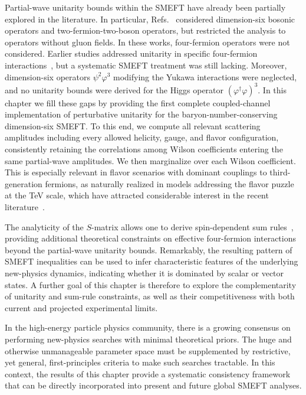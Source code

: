 Partial-wave unitarity bounds within the SMEFT have already been partially explored in the
literature. In particular, Refs.~\cite{Corbett:2014ora,Corbett:2017qgl,Cao:2023qks} considered
dimension-six bosonic operators and two-fermion-two-boson operators, but restricted the analysis to
operators without gluon fields. In these works, four-fermion operators were not considered. Earlier
studies addressed unitarity in specific four-fermion interactions~\cite{Anders:1993dk}, but a
systematic SMEFT treatment was still lacking. Moreover, dimension-six operators $\psi^2\varphi^3$
modifying the Yukawa interactions were neglected, and no unitarity bounds were derived for the Higgs
operator $(\varphi^\dagger \varphi)^3$.
In this chapter we fill these gaps by providing the first complete coupled-channel implementation of
perturbative unitarity for the baryon-number-conserving dimension-six SMEFT. To this end, we compute
all relevant scattering amplitudes including every allowed helicity, gauge, and flavor configuration,
consistently retaining the correlations among Wilson coefficients entering the same partial-wave
amplitudes. We then marginalize over each Wilson coefficient. This is especially relevant in flavor
scenarios with dominant couplings to third-generation fermions, as naturally realized in models
addressing the flavor puzzle at the TeV scale, which have attracted considerable interest in the
recent
literature~\cite{Bordone:2017bld,Greljo:2018tuh,Allwicher:2020esa,Fuentes-Martin:2020bnh,%
Fuentes-Martin:2022xnb,Barbieri:2023qpf,Barbieri:2024zkh,Davighi:2023evx,Davighi:2023iks,%
Fuentes-Martin:2024fpx,Covone:2024elw,Lizana:2024jby,FernandezNavarro:2023rhv,%
FernandezNavarro:2024hnv,FernandezNavarro:2025zmb,Isidori:2025rci,Greljo:2025mwj}.

The analyticity of the $S$-matrix allows one to derive spin-dependent sum
rules~\cite{Low:2009di,Altmannshofer:2023bfk,Altmannshofer:2025lun,Gu:2020thj,Azatov:2021ygj,%
Remmen:2020uze,Remmen:2022orj}, providing additional theoretical constraints on effective
four-fermion interactions beyond the partial-wave unitarity bounds. Remarkably, the resulting pattern
of SMEFT inequalities can be used to infer characteristic features of the underlying new-physics
dynamics, indicating whether it is dominated by scalar or vector states. A further goal of this
chapter is therefore to explore the complementarity of unitarity and sum-rule constraints, as well as
their competitiveness with both current and projected experimental limits.

In the high-energy particle physics community, there is a growing consensus on performing
new-physics searches with minimal theoretical priors. The huge and otherwise unmanageable parameter
space must be supplemented by restrictive, yet general, first-principles criteria to make such
searches tractable. In this context, the results of this chapter provide a systematic consistency
framework that can be directly incorporated into present and future global SMEFT analyses.

